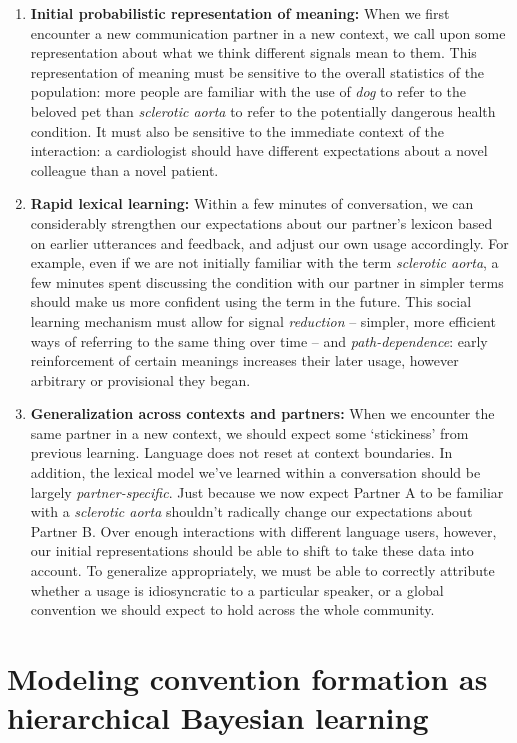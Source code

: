 \documentclass[11pt, floatsintext, man]{apa6}
\begin{document}
\begin{enumerate}
\item \textbf{Initial probabilistic representation of meaning:} When we first encounter a new communication partner in a new context, we call upon some representation about what we think different signals mean to them. This representation of meaning must be sensitive to the overall statistics of the population: more people are familiar with the use of \emph{dog} to refer to the beloved pet than \emph{sclerotic aorta} to refer to the potentially dangerous health condition. It must also be sensitive to the immediate context of the interaction: a cardiologist should have different expectations about a novel colleague than a novel patient.
\item \textbf{Rapid lexical learning:} Within a few minutes of conversation, we can considerably strengthen our expectations about our partner's lexicon based on earlier utterances and feedback, and adjust our own usage accordingly. For example, even if we are not initially familiar with the term \emph{sclerotic aorta}, a few minutes spent discussing the condition with our partner in simpler terms should make us more confident using the term in the future. This social learning mechanism must allow for signal \emph{reduction} -- simpler, more efficient ways of referring to the same thing over time -- and \emph{path-dependence}: early reinforcement of certain meanings increases their later usage, however arbitrary or provisional they began. 
\item \textbf{Generalization across contexts and partners:} When we encounter the same partner in a new context, we should expect some `stickiness' from previous learning. Language does not reset at context boundaries. In addition, the lexical model we've learned within a conversation should be largely \emph{partner-specific}. Just because we now expect Partner A to be familiar with a \emph{sclerotic aorta} shouldn't radically change our expectations about Partner B. Over enough interactions with different language users, however, our initial representations should be able to shift to take these data into account. To generalize appropriately, we must be able to correctly attribute whether a usage is idiosyncratic to a particular speaker, or a global convention we should expect to hold across the whole community.

\end{enumerate}

\section{Modeling convention formation as hierarchical Bayesian learning}
\end{document}
